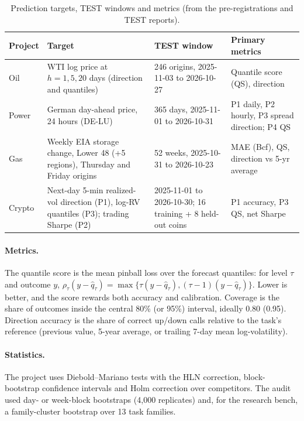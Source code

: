 \documentclass[10pt,a4paper]{article}
\begin{document}
\begin{table}[H]
\centering\small
\caption{Prediction targets, TEST windows and metrics (from the pre-registrations and TEST reports).}
\label{tab:protocol}
\begin{tabularx}{\linewidth}{@{}p{2.1cm}Xp{3.2cm}p{3.6cm}@{}}
\toprule
Project & Target & TEST window & Primary metrics\\
\midrule
Oil & WTI log price at $h=1,5,20$ days (direction and quantiles) & 246 origins, 2025-11-03 to 2026-10-27 & Quantile score (QS), direction\\
Power & German day-ahead price, 24 hours (DE-LU) & 365 days, 2025-11-01 to 2026-10-31 & P1 daily, P2 hourly, P3 spread direction; P4 QS\\
Gas & Weekly EIA storage change, Lower 48 (+5 regions), Thursday and Friday origins & 52 weeks, 2025-10-31 to 2026-10-23 & MAE (Bcf), QS, direction vs 5-yr average\\
Crypto & Next-day 5-min realized-vol direction (P1), log-RV quantiles (P3); trading Sharpe (P2) & 2025-11-01 to 2026-10-30; 16 training + 8 held-out coins & P1 accuracy, P3 QS, net Sharpe\\
\bottomrule
\end{tabularx}
\end{table}

\paragraph{Metrics.} The quantile score is the mean pinball loss over the forecast quantiles: for level $\tau$ and outcome $y$, $\rho_\tau(y-\hat q_\tau)=\max\{\tau(y-\hat q_\tau),(\tau-1)(y-\hat q_\tau)\}$. Lower is better, and the score rewards both accuracy and calibration. Coverage is the share of outcomes inside the central 80\% (or 95\%) interval, ideally 0.80 (0.95). Direction accuracy is the share of correct up/down calls relative to the task's reference (previous value, 5-year average, or trailing 7-day mean log-volatility).

\paragraph{Statistics.} The project uses Diebold--Mariano tests with the HLN correction, block-bootstrap confidence intervals and Holm correction over competitors. The audit used day- or week-block bootstraps (4,000 replicates) and, for the research bench, a family-cluster bootstrap over 13 task families.
\end{document}
